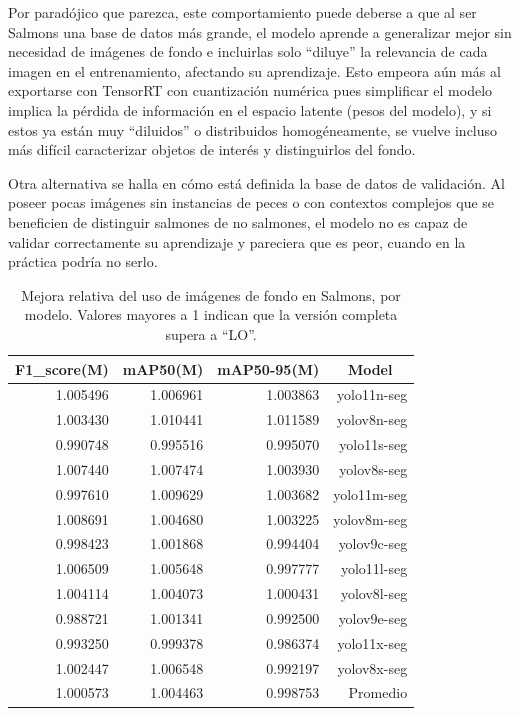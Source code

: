 Por paradójico que parezca, este comportamiento puede deberse a que al ser Salmons una base de datos más grande, el modelo aprende a generalizar mejor sin necesidad de imágenes de fondo e incluirlas solo ``diluye'' la relevancia de cada imagen en el entrenamiento, afectando su aprendizaje. Esto empeora aún más al exportarse con TensorRT con cuantización numérica pues simplificar el modelo implica la pérdida de información en el espacio latente (pesos del modelo), y si estos ya están muy ``diluidos'' o distribuidos homogéneamente, se vuelve incluso más difícil caracterizar objetos de interés y distinguirlos del fondo.

Otra alternativa se halla en cómo está definida la base de datos de validación. Al poseer pocas imágenes sin instancias de peces o con contextos complejos que se beneficien de distinguir salmones de no salmones, el modelo no es capaz de validar correctamente su aprendizaje y pareciera que es peor, cuando en la práctica podría no serlo.

\begin{table}[htbp]
\centering
\caption[Mejora relativa del uso de imágenes de fondo en Salmons, por modelo]{Mejora relativa del uso de imágenes de fondo en Salmons, por modelo. Valores mayores a 1 indican que la versión completa supera a ``LO''.}
\label{tab:salmons_mejoraRelativa_model}
\begin{tabular}{|r|r|r|r|}
\hline
\multicolumn{1}{|c|}{\textbf{F1\_score(M)}} & \multicolumn{1}{c|}{\textbf{mAP50(M)}} & \multicolumn{1}{c|}{\textbf{mAP50-95(M)}} & \multicolumn{1}{c|}{\textbf{Model}} \\ \hline
1.005496 & 1.006961 & 1.003863 & yolo11n-seg \\ \hline
1.003430 & 1.010441 & 1.011589 & yolov8n-seg \\ \hline
0.990748 & 0.995516 & 0.995070 & yolo11s-seg \\ \hline
1.007440 & 1.007474 & 1.003930 & yolov8s-seg \\ \hline
0.997610 & 1.009629 & 1.003682 & yolo11m-seg \\ \hline
1.008691 & 1.004680 & 1.003225 & yolov8m-seg \\ \hline
0.998423 & 1.001868 & 0.994404 & yolov9c-seg \\ \hline
1.006509 & 1.005648 & 0.997777 & yolo11l-seg \\ \hline
1.004114 & 1.004073 & 1.000431 & yolov8l-seg \\ \hline
0.988721 & 1.001341 & 0.992500 & yolov9e-seg \\ \hline
0.993250 & 0.999378 & 0.986374 & yolo11x-seg \\ \hline
1.002447 & 1.006548 & 0.992197 & yolov8x-seg \\ \hline
1.000573 & 1.004463 & 0.998753 & Promedio \\ \hline
\end{tabular}
\end{table}

